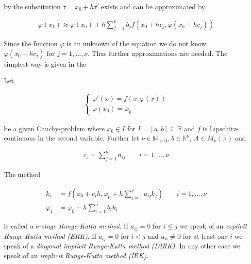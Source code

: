 by the substitution $\tau = x_0 + h\tau'$ exists and can be approximated by

\begin{gather}
	\boxed{\varphi(x_1) \approx \varphi(x_0) + h \sum\limits_{j = 1}^\nu b_jf\left(  x_0 + hc_j, \varphi\left( x_0 + hc_j \right)  \right)}
\end{gather}

Since the function $\varphi$ is an unknown of the equation we do not know $\varphi(x_0 + hc_j)$ for $j = 1,\hdots, \nu$. Thus further approximations are needed. The simplest way is given in the

\begin{mdframed}
	\begin{definition}
		Let 
		
		\begin{gather*}
			\begin{cases}
				\varphi'(x) = f(x, \varphi(x))\\
				\varphi(x_0) = \varphi_0
			\end{cases}
		\end{gather*}
		
		be a given Cauchy-problem where $x_0 \in I$ for $I = [a,b] \subseteq \mathbb{R}$ and $f$ is Lipschitz-continuous in the second variable. Further let $\nu \in \mathbb{N}_{>0}$, $b \in \mathbb{R}^\nu$, $A \in M_\nu(\mathbb{R})$ and 

		\begin{gather}
			c_i = \sum\limits_{j = 1}^\nu a_{ij} \qquad i = 1,\hdots, \nu
		\end{gather}

		The method

		\begin{align}
			k_i &= f\left( x_0 + c_ih, \varphi_0 + h \sum\limits_{j = 1}^\nu a_{ij}k_j \right) \qquad i = 1,\hdots,\nu\\
			\varphi_1 &= \varphi_0 + h \sum\limits_{i = 1}^\nu b_i k_i
		\end{align}

		is called a \emph{$\nu$-stage Runge-Kutta method}. If $a_{ij} = 0$ for $i \leqslant j$ we speak of an \emph{explicit Runge-Kutta method (ERK)}. If $a_{ij} = 0$ for $i < j$ and $a_{ii} \neq 0$ for at least one $i$ we speak of a \emph{diagonal implicit Runge-Kutta method (DIRK)}. In any other case we speak of an \emph{implicit Runge-Kutta method (IRK)}.
	\end{definition}
\end{mdframed}

